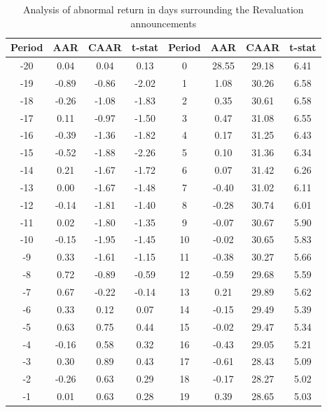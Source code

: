 \documentclass{beamer}
\begin{document}
	
	\begin{frame}
		
		\centering
		\begin{table}[htbp]
			\centering
			
			\captionsetup{labelformat=empty}
			\caption{\tiny Analysis of abnormal return in days surrounding the Revaluation announcements}
			\resizebox{0.8\textheight}{!}
			{\tiny
				\begin{tabular}{cccc|cccc}
					\hline\hline 
					Period & \multicolumn{1}{c}{AAR} & \multicolumn{1}{c}{CAAR} & \multicolumn{1}{c}{t-stat} & Period & \multicolumn{1}{c}{AAR} & \multicolumn{1}{c}{CAAR} & \multicolumn{1}{c}{t-stat} \\
					\hline
					-20   & 0.04  & 0.04  & 0.13  & 0     & 28.55 & 29.18 & 6.41 \\
					-19   & -0.89 & -0.86 & -2.02 & 1     & 1.08  & 30.26 & 6.58 \\
					-18   & -0.26 & -1.08 & -1.83 & 2     & 0.35  & 30.61 & 6.58 \\
					-17   & 0.11  & -0.97 & -1.50 & 3     & 0.47  & 31.08 & 6.55 \\
					-16   & -0.39 & -1.36 & -1.82 & 4     & 0.17  & 31.25 & 6.43 \\
					-15   & -0.52 & -1.88 & -2.26 & 5     & 0.10  & 31.36 & 6.34 \\
					-14   & 0.21  & -1.67 & -1.72 & 6     & 0.07  & 31.42 & 6.26 \\
					-13   & 0.00  & -1.67 & -1.48 & 7     & -0.40 & 31.02 & 6.11 \\
					-12   & -0.14 & -1.81 & -1.40 & 8     & -0.28 & 30.74 & 6.01 \\
					-11   & 0.02  & -1.80 & -1.35 & 9     & -0.07 & 30.67 & 5.90 \\
					-10   & -0.15 & -1.95 & -1.45 & 10    & -0.02 & 30.65 & 5.83 \\
					-9    & 0.33  & -1.61 & -1.15 & 11    & -0.38 & 30.27 & 5.66 \\
					-8    & 0.72  & -0.89 & -0.59 & 12    & -0.59 & 29.68 & 5.59 \\
					-7    & 0.67  & -0.22 & -0.14 & 13    & 0.21  & 29.89 & 5.62 \\
					-6    & 0.33  & 0.12  & 0.07  & 14    & -0.15 & 29.49 & 5.39 \\
					-5    & 0.63  & 0.75  & 0.44  & 15    & -0.02 & 29.47 & 5.34 \\
					-4    & -0.16 & 0.58  & 0.32  & 16    & -0.43 & 29.05 & 5.21 \\
					-3    & 0.30  & 0.89  & 0.43  & 17    & -0.61 & 28.43 & 5.09 \\
					-2    & -0.26 & 0.63  & 0.29  & 18    & -0.17 & 28.27 & 5.02 \\
					-1    & 0.01  & 0.63  & 0.28  & 19    & 0.39  & 28.65 & 5.03 \\
					\hline\hline
				\end{tabular}%
			}
		\end{table}%
		
		
	\end{frame}
	
\end{document}
